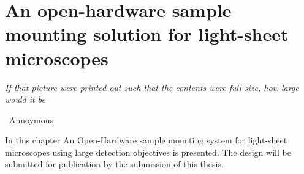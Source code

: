 \ifpdf
    \graphicspath{{Chapters/chamber/Figs/Raster/}{Chapters/chamber/Figs/PDF/}{Chapters/chamber/Figs/}}
\else
    \graphicspath{{Chapters/chamber/Figs/Vector/}{Chapters/chamber/Figs/}}
\fi


\chapter{An open-hardware sample mounting solution for light-sheet microscopes}\label{chapter:chamber}
\epigraph{\emph{If that picture were printed out such that the contents were full size, how large would it be}}{--Annoymous}
 In this chapter An Open-Hardware sample mounting system for light-sheet microscopes using large detection objectives is presented.
 The design will be submitted for publication by the submission of this thesis.

